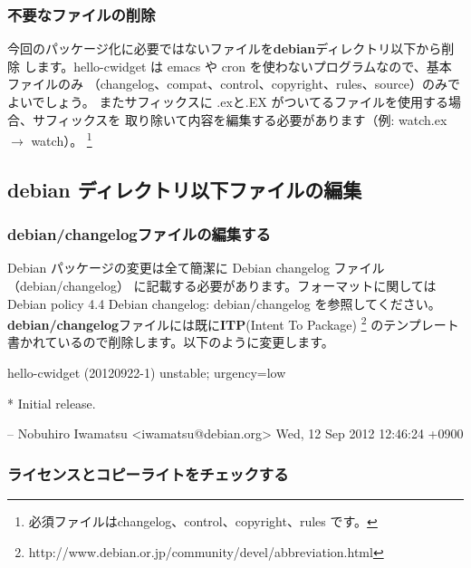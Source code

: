 \documentclass[mingoth,a4paper]{jsarticle}
\begin{document}
\subsubsection{不要なファイルの削除}
今回のパッケージ化に必要ではないファイルを{\bf debian}ディレクトリ以下から削除
します。hello-cwidget は emacs や cron を使わないプログラムなので、基本ファイルのみ
（changelog、compat、control、copyright、rules、source）のみでよいでしょう。
またサフィックスに .exと.EX がついてるファイルを使用する場合、サフィックスを
取り除いて内容を編集する必要があります（例: watch.ex $\rightarrow$ watch）。
\footnote{必須ファイルはchangelog、control、copyright、rules です。}


\subsection{debian ディレクトリ以下ファイルの編集}

\subsubsection{debian/changelogファイルの編集する}

Debian パッケージの変更は全て簡潔に Debian changelog ファイル（debian/changelog）
に記載する必要があります。フォーマットに関しては
Debian policy 4.4 Debian changelog: debian/changelog を参照してください。
{\bf debian/changelog}ファイルには既に{\bf ITP}(Intent To Package)
\footnote{http://www.debian.or.jp/community/devel/abbreviation.html}
のテンプレート書かれているので削除します。以下のように変更します。

\begin{commandline}
hello-cwidget (20120922-1) unstable; urgency=low

  * Initial release.

 -- Nobuhiro Iwamatsu <iwamatsu@debian.org>  Wed, 12 Sep 2012 12:46:24 +0900

\end{commandline}

\subsubsection{ライセンスとコピーライトをチェックする}
\end{document}
